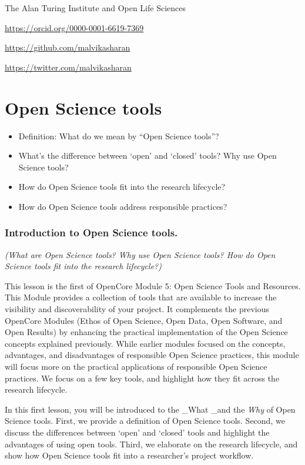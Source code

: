 \documentclass[
  letterpaper,
  DIV=11,
  numbers=noendperiod]{scrreport}
\providecommand{\tightlist}{%
  \setlength{\itemsep}{0pt}\setlength{\parskip}{0pt}}\usepackage{longtable,booktabs,array}
\begin{document}
The Alan Turing Institute and Open Life Sciences

\url{https://orcid.org/0000-0001-6619-7369}

\url{https://github.com/malvikasharan}

\url{https://twitter.com/malvikasharan}

\part{Open Science tools}

\begin{itemize}
\tightlist
\item
  Definition: What do we mean by ``Open Science tools''?
\item
  What's the difference between `open' and `closed' tools? Why use Open
  Science tools?
\item
  How do Open Science tools fit into the research lifecycle?
\item
  How do Open Science tools address responsible practices?
\end{itemize}

\hypertarget{introduction-to-open-science-tools.}{%
\section*{Introduction to Open Science
tools.}\label{introduction-to-open-science-tools.}}


\emph{(What are Open Science tools? Why use Open Science tools? How do
Open Science tools fit into the research lifecycle?)}

This lesson is the first of OpenCore Module 5: Open Science Tools and
Resources. This Module provides a collection of tools that are available
to increase the visibility and discoverability of your project. It
complements the previous OpenCore Modules (Ethos of Open Science, Open
Data, Open Software, and Open Results) by enhancing the practical
implementation of the Open Science concepts explained previously. While
earlier modules focused on the concepts, advantages, and disadvantages
of responsible Open Science practices, this module will focus more on
the practical applications of responsible Open Science practices. We
focus on a few key tools, and highlight how they fit across the research
lifecycle.

In this first lesson, you will be introduced to the \_What \_and the
\emph{Why} of Open Science tools. First, we provide a definition of Open
Science tools. Second, we discuss the differences between `open' and
`closed' tools and highlight the advantages of using open tools. Third,
we elaborate on the research lifecycle, and show how Open Science tools
fit into a researcher's project workflow.
\end{document}

